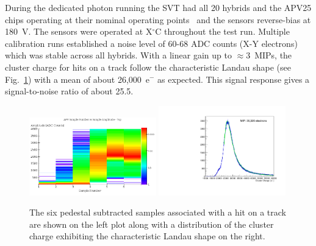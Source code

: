 During the dedicated photon running the SVT had all 20 hybrids and the APV25 chips operating at their 
nominal operating points~\cite{Jones:1069892} and the sensors reverse-bias at 180~V.  The sensors were 
operated at X$^\circ$C throughout the test run. Multiple calibration runs established a noise level of 60-68 
ADC counts (X-Y electrons) which was stable across all hybrids. With a linear gain up to $\approx 3$~MIPs, the 
cluster charge for hits on a track follow the characteristic Landau shape (see Fig.~\ref{fig:cluster_pulse}) with a 
mean of about 26,000~e$^{-}$ as expected. This signal response gives a signal-to-noise ratio of about 25.5. 
\begin{figure}[h]
	\includegraphics[width=0.49\textwidth]{test2012/svtperformance/svt_calib/08062012_run1351_samples_vs_amplitude.png}
	\includegraphics[width=0.49\textwidth]{test2012/svtperformance/svt_calib/run1351_mip_small.pdf}
    \caption{The six pedestal subtracted samples associated with a hit on a track 
             are shown on the left plot along with a distribution of the cluster
             charge exhibiting the characteristic Landau shape on the right. 
            }
	\label{fig:cluster_pulse}
\end{figure}


